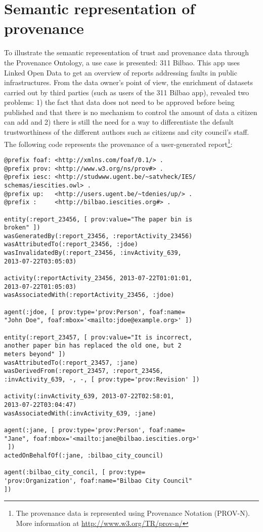 \section{Semantic representation of provenance}
\label{sec:use_cases}

To illustrate the semantic representation of trust and provenance data through the Provenance Ontology, a use case is presented: 311 Bilbao. This app uses Linked Open Data to get an overview of reports addressing faults in public infrastructures. From the data owner’s point of view, the enrichment of datasets carried out by third parties (such as users of the 311 Bilbao app), revealed two problems: 1) the fact that data does not need to be approved before being published and that there is no mechanism to control the amount of data a citizen can add and 2) there is still the need for a way to differentiate the default trustworthiness of the different authors such as citizens and city council's staff. The following code represents the provenance of a user-generated report\footnote{The provenance data is represented using Provenance Notation (PROV-N). More information at \url{http://www.w3.org/TR/prov-n/}}:

\lstset{numbers=left, basicstyle=\ttfamily\scriptsize,}
\begin{lstlisting}
@prefix foaf: <http://xmlns.com/foaf/0.1/> .
@prefix prov: <http://www.w3.org/ns/prov#> .
@prefix iesc: <http://studwww.ugent.be/~satvheck/IES/
schemas/iescities.owl> .
@prefix up:   <http://users.ugent.be/~tdenies/up/> .
@prefix :     <http://bilbao.iescities.org#> .

entity(:report_23456, [ prov:value="The paper bin is
broken" ])
wasGeneratedBy(:report_23456, :reportActivity_23456)
wasAttributedTo(:report_23456, :jdoe)
wasInvalidatedBy(:report_23456, :invActivity_639,
2013-07-22T03:05:03)

activity(:reportActivity_23456, 2013-07-22T01:01:01,
2013-07-22T01:05:03)
wasAssociatedWith(:reportActivity_23456, :jdoe)

agent(:jdoe, [ prov:type='prov:Person', foaf:name=
"John Doe", foaf:mbox='<mailto:jdoe@example.org>' ])

entity(:report_23457, [ prov:value="It is incorrect,
another paper bin has replaced the old one, but 2
meters beyond" ])
wasAttributedTo(:report_23457, :jane)
wasDerivedFrom(:report_23457, :report_23456,
:invActivity_639, -, -, [ prov:type='prov:Revision' ])

activity(:invActivity_639, 2013-07-22T02:58:01,
2013-07-22T03:04:47)
wasAssociatedWith(:invActivity_639, :jane)

agent(:jane, [ prov:type='prov:Person', foaf:name=
"Jane", foaf:mbox='<mailto:jane@bilbao.iescities.org>'
 ])
actedOnBehalfOf(:jane, :bilbao_city_council)

agent(:bilbao_city_concil, [ prov:type=
'prov:Organization', foaf:name="Bilbao City Council"
])

\end{lstlisting}

